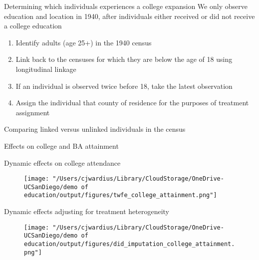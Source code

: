 \documentclass[notes,11pt, aspectratio=169]{beamer}
\begin{document}
\begin{frame}{Determining which individuals experiences a college expansion}
  We only observe education and location in 1940, after individuals either received or did not receive a college education \vspace{.4cm}
  \begin{enumerate}
    \item Identify adults (age 25+) in the 1940 census
    \item Link back to the censuses for which they are below the age of 18 using \cite{rugglesIPUMSUSAVersion2025} longitudinal linkage
    \item If an individual is observed twice before 18, take the latest observation
    \item Assign the individual that county of residence for the purposes of treatment assignment 
  \end{enumerate}
\end{frame}

\begin{frame}{Comparing linked versus unlinked individuals in the census}
  
\end{frame}

\begin{frame}[label=effects]{Effects on college and BA attainment}
  
  \vspace{1em}
  \centering
  \hyperlink{reviewestimates}{}
\end{frame}



\begin{frame}[label=effects]{Dynamic effects on college attendance}
  \begin{figure}
        \centering
        \texttt{[image: "/Users/cjwardius/Library/CloudStorage/OneDrive-UCSanDiego/demo of education/output/figures/twfe\_college\_attainment.png"]}
    \end{figure}
\end{frame}


\begin{frame}[label=effects]{Dynamic effects adjusting for treatment heterogeneity}
  \begin{figure}
        \centering
        \texttt{[image: "/Users/cjwardius/Library/CloudStorage/OneDrive-UCSanDiego/demo of education/output/figures/did\_imputation\_college\_attainment.png"]}
    \end{figure}
\end{frame}
\end{document}
